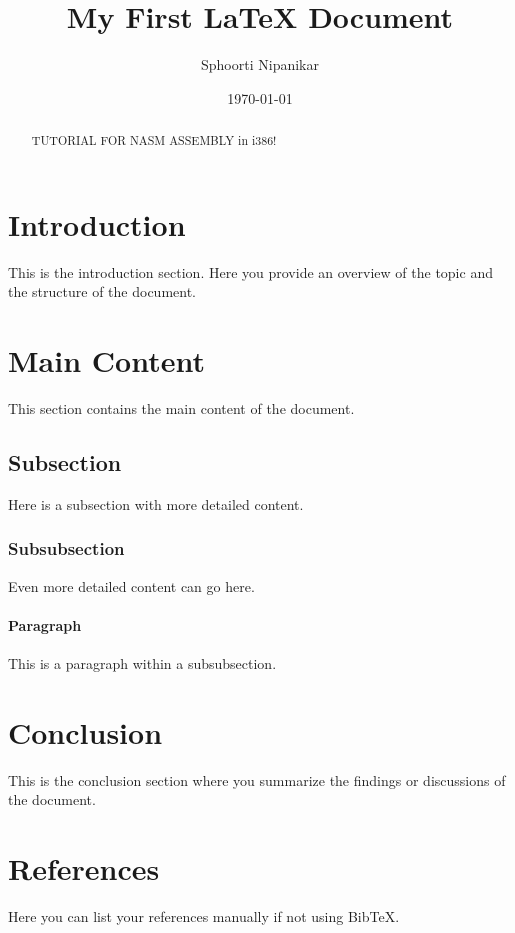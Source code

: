 \documentclass[a4paper,12pt]{article}
\title{My First LaTeX Document}
\author{Sphoorti Nipanikar}
\date{\today}                 %
\begin{document}
\maketitle

\begin{abstract}
TUTORIAL FOR NASM ASSEMBLY in i386!
\end{abstract}

\section{Introduction}
This is the introduction section. Here you provide an overview of the topic and the structure of the document.

\section{Main Content}
This section contains the main content of the document.

\subsection{Subsection}
Here is a subsection with more detailed content.

\subsubsection{Subsubsection}
Even more detailed content can go here.

\paragraph{Paragraph}
This is a paragraph within a subsubsection.

\section{Conclusion}
This is the conclusion section where you summarize the findings or discussions of the document.

\section*{References}
% 
% 

Here you can list your references manually if not using BibTeX.
\end{document}
